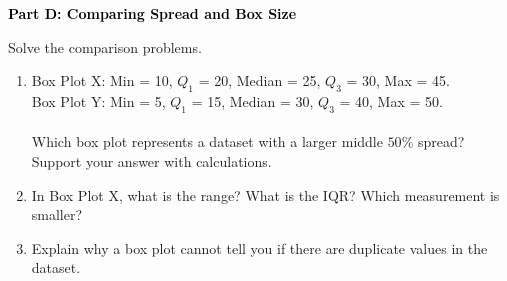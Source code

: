 \documentclass[12pt, letterpaper, fleqn]{article}
\begin{document}
\newpage

\begin{tcolorbox}[colback=black!10]
    \large\textcolor{black}{\textbf{Part D: Comparing Spread and Box Size}}
\end{tcolorbox}

\vspace{3mm}

\noindent
Solve the comparison problems.

\vspace{5mm}

\begin{enumerate}[itemsep=2.5cm, leftmargin=0.6cm]
\item Box Plot X: Min = 10, $Q_1$ = 20, Median = 25, $Q_3$ = 30, Max = 45. \\
Box Plot Y: Min = 5, $Q_1$ = 15, Median = 30, $Q_3$ = 40, Max = 50. \\ \\
Which box plot represents a dataset with a larger middle $50\%$ spread? Support your answer with calculations.
\vspace{1cm}

\item In Box Plot X, what is the range? What is the IQR? Which measurement is smaller?
\vspace{1.5cm}

\item Explain why a box plot cannot tell you if there are duplicate values in the dataset.
\end{enumerate}
\end{document}
